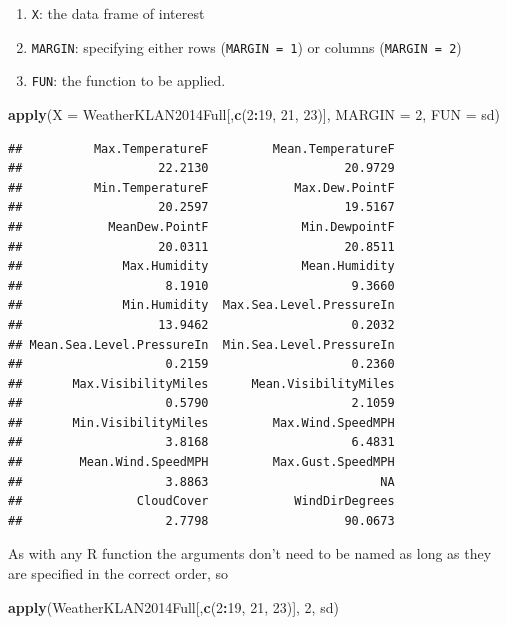 \documentclass[
]{krantz}
\newenvironment{Shaded}{\begin{snugshade}}{\end{snugshade}}
\newcommand{\DataTypeTok}[1]{\textcolor[rgb]{0.13,0.29,0.53}{#1}}
\newcommand{\DecValTok}[1]{\textcolor[rgb]{0.00,0.00,0.81}{#1}}
\newcommand{\KeywordTok}[1]{\textcolor[rgb]{0.13,0.29,0.53}{\textbf{#1}}}
\newcommand{\NormalTok}[1]{#1}
\newcommand{\OperatorTok}[1]{\textcolor[rgb]{0.81,0.36,0.00}{\textbf{#1}}}
\providecommand{\tightlist}{%
  \setlength{\itemsep}{0pt}\setlength{\parskip}{0pt}}
\begin{document}
\begin{enumerate}
\def\labelenumi{\arabic{enumi}.}
\tightlist
\item
  \texttt{X}: the data frame of interest
\item
  \texttt{MARGIN}: specifying either rows (\texttt{MARGIN\ =\ 1}) or columns (\texttt{MARGIN\ =\ 2})
\item
  \texttt{FUN}: the function to be applied.
\end{enumerate}

\begin{Shaded}
\begin{Highlighting}[]
\KeywordTok{apply}\NormalTok{(}\DataTypeTok{X =}\NormalTok{ WeatherKLAN2014Full[,}\KeywordTok{c}\NormalTok{(}\DecValTok{2}\OperatorTok{:}\DecValTok{19}\NormalTok{, }\DecValTok{21}\NormalTok{, }\DecValTok{23}\NormalTok{)], }\DataTypeTok{MARGIN =} \DecValTok{2}\NormalTok{, }\DataTypeTok{FUN =}\NormalTok{ sd)}
\end{Highlighting}
\end{Shaded}

\begin{verbatim}
##          Max.TemperatureF         Mean.TemperatureF 
##                   22.2130                   20.9729 
##          Min.TemperatureF            Max.Dew.PointF 
##                   20.2597                   19.5167 
##            MeanDew.PointF             Min.DewpointF 
##                   20.0311                   20.8511 
##              Max.Humidity             Mean.Humidity 
##                    8.1910                    9.3660 
##              Min.Humidity  Max.Sea.Level.PressureIn 
##                   13.9462                    0.2032 
## Mean.Sea.Level.PressureIn  Min.Sea.Level.PressureIn 
##                    0.2159                    0.2360 
##       Max.VisibilityMiles      Mean.VisibilityMiles 
##                    0.5790                    2.1059 
##       Min.VisibilityMiles         Max.Wind.SpeedMPH 
##                    3.8168                    6.4831 
##        Mean.Wind.SpeedMPH         Max.Gust.SpeedMPH 
##                    3.8863                        NA 
##                CloudCover            WindDirDegrees 
##                    2.7798                   90.0673
\end{verbatim}

As with any R function the arguments don't need to be named as long as they are specified in the correct order, so

\begin{Shaded}
\begin{Highlighting}[]
\KeywordTok{apply}\NormalTok{(WeatherKLAN2014Full[,}\KeywordTok{c}\NormalTok{(}\DecValTok{2}\OperatorTok{:}\DecValTok{19}\NormalTok{, }\DecValTok{21}\NormalTok{, }\DecValTok{23}\NormalTok{)], }\DecValTok{2}\NormalTok{, sd)}
\end{Highlighting}
\end{Shaded}
\end{document}
